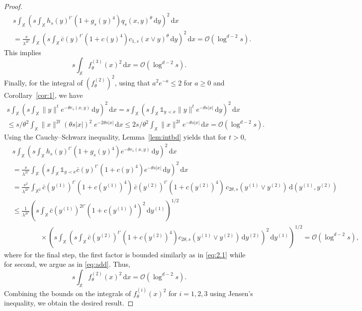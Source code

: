 \documentclass[11pt,reqno]{amsart}
\numberwithin{equation}{section}
\theoremstyle{definition}
\newcommand{\XX}{\mathbb{X}}
\newcommand{\diff}{{\,\mathrm d}}
\begin{document}
\begin{proof}
	\begin{align}\label{eq:add}
	&s \int_{\XX} \left(s \int_{\XX} h_s(y)^{t'} (1+g_s(y)^4) q_s(x,y)^{\theta}
	\diff y \right)^2 \diff x\nonumber\\
	&=  \frac{s}{\lambda^{2t'}} \int_{\XX} \left( s \int_{\XX} \bar c (y)^{t'}  (1+c(y)^4)
	c_{1,s}(x \vee y)^{\theta} \diff y \right)^2 \diff x=\mathcal{O}(\log^{d-2} s).
	\end{align}
This implies
		\begin{displaymath}
	s \int_{\XX} f_{\theta}^{(3)}(x)^2 \diff x =\mathcal{O}(\log^{d-2} s).
	\end{displaymath}
	Finally, for the integral of $(f_{\theta}^{(2)})^2$, using that $a^2 e^{-a} \le 2$ for
	$a\geq0$ and Corollary~\ref{cor:1}, we have 
	\begin{multline*}
	s\int_{\XX} \left(s\int_{\XX} \|y\|^t e^{-\theta r_s(x,y)}\diff y \right)^2
	\diff x
	= s \int_{\XX} \left(s \int_\XX \mathds{1}_{y \prec x} \|y\|^{t} e^{-\theta s |x|} 
	\diff y \right)^2 \diff x\\
	\le s/\theta^2 \int_{\XX} \|x\|^{2t} (\theta s|x|)^2\; e^{- 2\theta s |x|}\diff x
	\le 2 s/\theta^2 \int_{\XX} \|x\|^{2t} e^{-\theta s |x|}\diff x
	=\mathcal{O}(\log^{d-2} s). 
	\end{multline*}
	Using the
	Cauchy--Schwarz inequality,
	Lemma~\ref{lem:intbd} yields that for $t>0$,
	\begin{align*}
	&s\int_{\XX} \left(s\int_{\XX}h_s(y)^{t'} (1+g_s(y)^4) e^{-\theta r_s(x,y)}\diff y \right)^2
	\diff x\\
	&=\frac{s}{\lambda^{2t'}} \int_{\XX} \left(s \int_\XX \mathds{1}_{y \prec x} \bar c(y)^{t'} (1+c(y)^4) 
	e^{-\theta s |x|} \diff y\right)^2 \diff x\\
	&= \frac{s^2}{\lambda^{2t'}}  \int_{\XX^2} \bar c(y^{(1)})^{t'} (1+c(y^{(1)})^4)\, \bar c(y^{(2)})^{t'} (1+c(y^{(2)})^4) \, c_{2\theta,s}(y^{(1)}
	\vee y^{(2)}) 
	\diff (y^{(1)},y^{(2)})\\
	 &\le \frac{1}{\lambda^{2t'}} \left(s\int_\XX \bar c(y^{(1)})^{2t'} (1+c(y^{(1)})^4)^2
	\diff y^{(1)}\right)^{1/2} \\
	& \qquad \qquad \times \left(s \int_\XX \left( s\int_\XX \bar c(y^{(2)})^{t'} (1+c(y^{(2)})^4) c_{2\theta,s}(y^{(1)}
	\vee y^{(2)}) \diff y^{(2)}\right)^2 \diff y^{(1)}\right)^{1/2} =\mathcal{O}(\log^{d-2} s),
	\end{align*}
	where for the final step, the first factor is bounded similarly as in \eqref{eq:2.1} while for second, we argue as in \eqref{eq:add}. Thus,
	\begin{displaymath}
	s \int_{\XX} f_{\theta}^{(2)}(x)^2 \diff x =\mathcal{O}(\log^{d-2} s).
	\end{displaymath}
	Combining the bounds on the integrals of $f_{\theta}^{(i)}(x)^2$ for $i=1,2,3$ using Jensen's inequality, we obtain the desired result.	
\end{proof}
\end{document}
